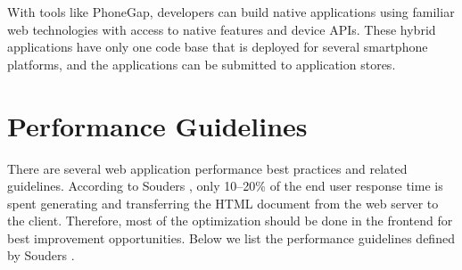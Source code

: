 With tools like PhoneGap, developers can build native applications
using familiar web technologies with access to native features and
device APIs. These hybrid applications have only one code base that is
deployed for several smartphone platforms, and the applications can be
submitted to application stores.

\clearpage
\section{Performance Guidelines}
\label{section:performance-guidelines}

There are several web application performance best practices and
related guidelines. According to Souders \cite{souders2007high}, only
10--20\% of the end user response time is spent generating and
transferring the HTML document from the web server to the
client. Therefore, most of the optimization should be done in the
frontend for best improvement opportunities. Below we list the
performance guidelines defined by Souders \cite{souders2007high}.

